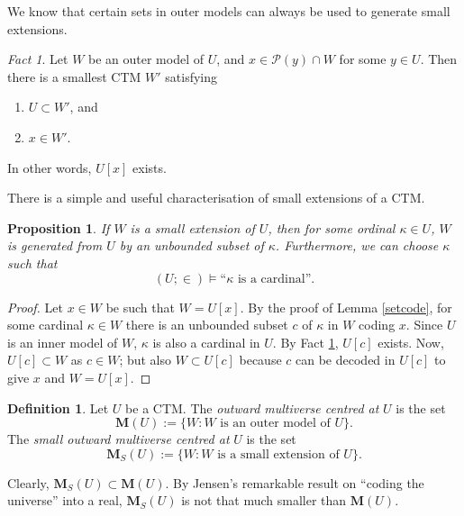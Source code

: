 \documentclass[12pt, twoside]{memoir}
\numberwithin{equation}{section}
\newtheorem{prop}[thm]{Proposition}
\theoremstyle{definition}
\newtheorem{defi}[thm]{Definition}
\theoremstyle{remark}
\newtheorem{fact}[thm]{Fact}
\theoremstyle{definition}
\theoremstyle{definition}
\theoremstyle{definition}
\theoremstyle{remark}
\begin{document}
We know that certain sets in outer models can always be used to generate small extensions.

\begin{fact}\label{fact34}
Let $W$ be an outer model of $U$, and $x \in \mathcal{P}(y) \cap W$ for some $y \in U$. Then there is a smallest CTM $W'$ satisfying
\begin{enumerate}[label=(\alph*)]
    \item $U \subset W'$, and
    \item $x \in W'$.
\end{enumerate}
In other words, $U[x]$ exists.
\end{fact}

There is a simple and useful characterisation of small extensions of a CTM.

\begin{prop}\label{prop35}
If $W$ is a small extension of $U$, then for some ordinal $\kappa \in U$, $W$ is generated from $U$ by an unbounded subset of $\kappa$. Furthermore, we can choose $\kappa$ such that
\begin{equation*}
    (U; \in) \models \text{``} \kappa \text{ is a cardinal''.}
\end{equation*}
\end{prop}

\begin{proof}
Let $x \in W$ be such that $W = U[x]$. By the proof of Lemma \ref{setcode}, for some cardinal $\kappa \in W$ there is an unbounded subset $c$ of $\kappa$ in $W$ coding $x$. Since $U$ is an inner model of $W$, $\kappa$ is also a cardinal in $U$. By Fact \ref{fact34}, $U[c]$ exists. Now, $U[c] \subset W$ as $c \in W$; but also $W \subset U[c]$ because $c$ can be decoded in $U[c]$ to give $x$ and $W = U[x]$.
\end{proof}

\begin{defi}
Let $U$ be a CTM. The \emph{outward multiverse centred at} $U$ is the set
\begin{equation*}
    \mathbf{M}(U) := \{W : W \text{ is an outer model of } U\} \text{.}
\end{equation*}
The \emph{small outward multiverse centred at} $U$ is the set
\begin{equation*}
    \mathbf{M}_{S}(U) := \{W : W \text{ is a small extension of } U\} \text{.}
\end{equation*}
\end{defi}

Clearly, $\mathbf{M}_{S}(U) \subset \mathbf{M}(U)$. By Jensen's remarkable result on ``coding the universe'' into a real, $\mathbf{M}_{S}(U)$ is not that much smaller than $\mathbf{M}(U)$.
\end{document}
